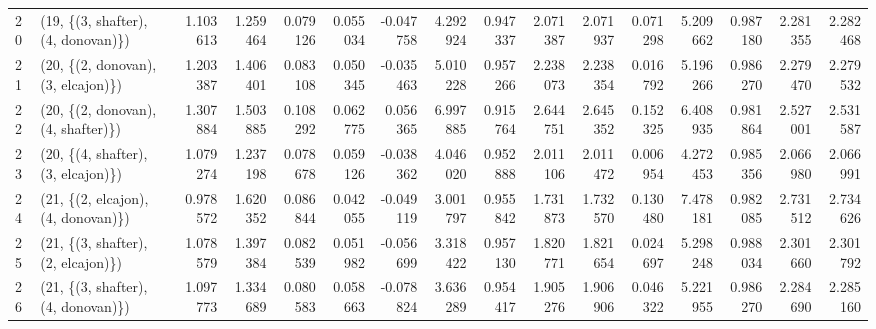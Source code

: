 \begin{tabular}{llrrrrrrrrrrrrrr}
20 &  (19, \{(3, shafter), (4, donovan)\}) &  1.103613 &  1.259464 &   0.079126 &  0.055034 & -0.047758 &   4.292924 &  0.947337 &   2.071387 &  2.071937 &  0.071298 &  5.209662 &  0.987180 &  2.281355 &  2.282468 \\
21 &  (20, \{(2, donovan), (3, elcajon)\}) &  1.203387 &  1.406401 &   0.083108 &  0.050345 & -0.035463 &   5.010228 &  0.957266 &   2.238073 &  2.238354 &  0.016792 &  5.196266 &  0.986270 &  2.279470 &  2.279532 \\
22 &  (20, \{(2, donovan), (4, shafter)\}) &  1.307884 &  1.503885 &   0.108292 &  0.062775 &  0.056365 &   6.997885 &  0.915764 &   2.644751 &  2.645352 &  0.152325 &  6.408935 &  0.981864 &  2.527001 &  2.531587 \\
23 &  (20, \{(4, shafter), (3, elcajon)\}) &  1.079274 &  1.237198 &   0.078678 &  0.059126 & -0.038362 &   4.046020 &  0.952888 &   2.011106 &  2.011472 &  0.006954 &  4.272453 &  0.985356 &  2.066980 &  2.066991 \\
24 &  (21, \{(2, elcajon), (4, donovan)\}) &  0.978572 &  1.620352 &   0.086844 &  0.042055 & -0.049119 &   3.001797 &  0.955842 &   1.731873 &  1.732570 &  0.130480 &  7.478181 &  0.982085 &  2.731512 &  2.734626 \\
25 &  (21, \{(3, shafter), (2, elcajon)\}) &  1.078579 &  1.397384 &   0.082539 &  0.051982 & -0.056699 &   3.318422 &  0.957130 &   1.820771 &  1.821654 &  0.024697 &  5.298248 &  0.988034 &  2.301660 &  2.301792 \\
26 &  (21, \{(3, shafter), (4, donovan)\}) &  1.097773 &  1.334689 &   0.080583 &  0.058663 & -0.078824 &   3.636289 &  0.954417 &   1.905276 &  1.906906 &  0.046322 &  5.221955 &  0.986270 &  2.284690 &  2.285160 \\
\bottomrule
\end{tabular}
